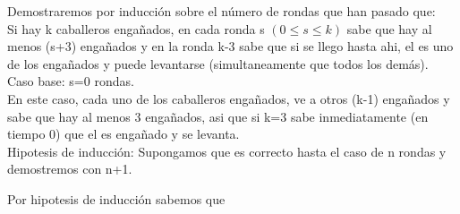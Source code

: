 \documentclass{article}
\begin{document}
\begin{enumerate}
Demostraremos por inducción sobre el número de rondas que han pasado que:\\
Si hay k caballeros engañados, en cada ronda s $(0 \le s \le k)$ sabe que hay al menos (s+3) engañados y en la ronda k-3 sabe que si se llego hasta ahi, el es uno de los engañados y puede levantarse (simultaneamente que todos los demás).\\

Caso base: s=0 rondas.\\
En este caso, cada uno de los caballeros engañados, ve a otros (k-1) engañados y sabe que hay al menos 3 engañados, asi que si k=3 sabe inmediatamente (en tiempo 0) que el es engañado y se levanta.\\

Hipotesis de inducción: Supongamos que es correcto hasta el caso de n rondas y demostremos con n+1.

Por hipotesis de inducción sabemos que


\end{enumerate}
\end{document}
